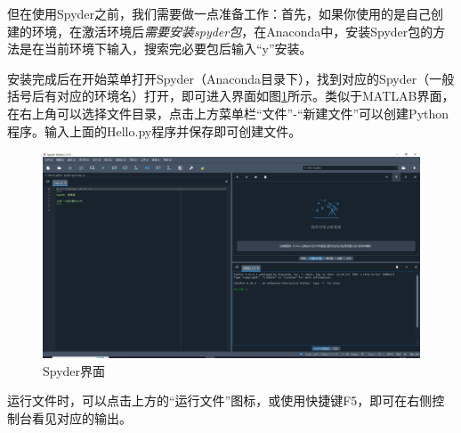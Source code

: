 但在使用Spyder之前，我们需要做一点准备工作：首先，如果你使用的是自己创建的环境，在激活环境后\emph{需要安装spyder包}，在Anaconda中，安装Spyder包的方法是在当前环境下输入，搜索完必要包后输入“y”安装。

安装完成后在开始菜单打开Spyder（Anaconda目录下），找到对应的Spyder（一般括号后有对应的环境名）打开，即可进入界面如图\ref{fig:安装Python-Spyder界面}所示。类似于MATLAB界面，在右上角可以选择文件目录，点击上方菜单栏“文件”-“新建文件”可以创建Python程序。输入上面的Hello.py程序并保存即可创建文件。

\begin{figure}
    \centering
    \includegraphics[width=1\linewidth]{Python与机器学习/基础Python语法/安装Python/fig/Spyder界面.png}
    \caption{Spyder界面}
    \label{fig:安装Python-Spyder界面}
\end{figure}

运行文件时，可以点击上方的“运行文件”图标，或使用快捷键F5，即可在右侧控制台看见对应的输出。


